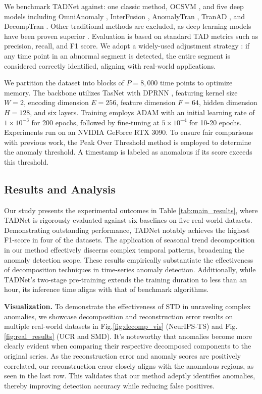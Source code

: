 \documentclass{article}
\begin{document}
We benchmark TADNet against: one classic method, OCSVM \cite{scholkopf2001estimating}, and five deep models including OmniAnomaly \cite{su2019robust}, InterFusion \cite{li2021multivariate}, AnomalyTran \cite{xu2021anomaly}, TranAD \cite{tuli2022tranad}, and DecompTran \cite{qin2022decomposed}. Other traditional methods are excluded, as deep learning models have been proven superior \cite{xu2021anomaly}. Evaluation is based on standard TAD metrics such as precision, recall, and F1 score. We adopt a widely-used adjustment strategy \cite{su2019robust, xu2021anomaly, tuli2022tranad, qin2022decomposed}: if any time point in an abnormal segment is detected, the entire segment is considered correctly identified, aligning with real-world applications.

We partition the dataset into blocks of \(P=8,000\) time points to optimize memory. The backbone utilizes TasNet with DPRNN \cite{luo2020dual}, featuring kernel size \(W=2\), encoding dimension \(E=256\), feature dimension \(F=64\), hidden dimension \(H=128\), and six layers. Training employs ADAM with an initial learning rate of \(1 \times 10^{-3}\) for 200 epochs, followed by fine-tuning at \(5 \times 10^{-4}\) for 10-20 epochs. Experiments run on an NVIDIA GeForce RTX 3090. To ensure fair comparisons with previous work, the Peak Over Threshold method \cite{siffer2017anomaly} is employed to determine the anomaly threshold. A timestamp is labeled as anomalous if its score exceeds this threshold.

\subsection{Results and Analysis}
Our study presents the experimental outcomes in Table \ref{tab:main_results}, where TADNet is rigorously evaluated against six baselines on five real-world datasets. Demonstrating outstanding performance, TADNet notably achieves the highest F1-score in four of the datasets. The application of seasonal trend decomposition in our method effectively discerns complex temporal patterns, broadening the anomaly detection scope. These results empirically substantiate the effectiveness of decomposition techniques in time-series anomaly detection. Additionally, while TADNet's two-stage pre-training extends the training duration to less than an hour, its inference time aligns with that of benchmark algorithms.

\textbf{Visualization.}
To demonstrate the effectiveness of STD in unraveling complex anomalies, we showcase decomposition and reconstruction error results on multiple real-world datasets in Fig.\ref{fig:decomp_vis} (NeurIPS-TS) and Fig.\ref{fig:real_results} (UCR and SMD). It's noteworthy that anomalies become more clearly evident when comparing their respective decomposed components to the original series. As the reconstruction error and anomaly scores are positively correlated, our reconstruction error closely aligns with the anomalous regions, as seen in the last row. This validates that our method adeptly identifies anomalies, thereby improving detection accuracy while reducing false positives.
\end{document}
